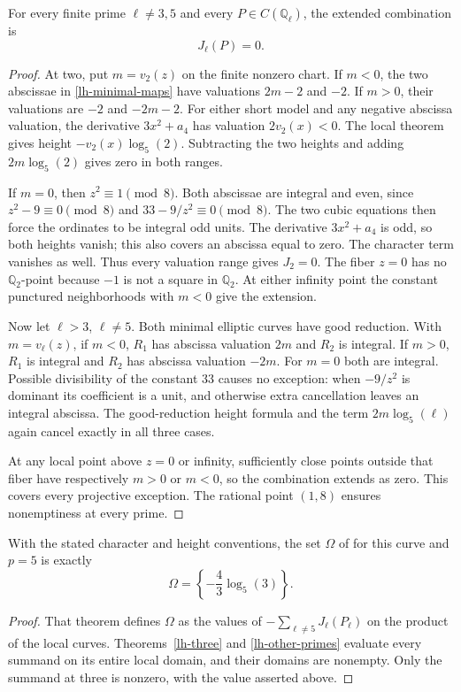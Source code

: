 \begin{theorem}
\label{lh-other-primes}
For every finite prime \(\ell\ne3,5\) and every
\(P\in C(\mathbb Q_\ell)\), the extended combination is
\[
 J_\ell(P)=0.
\]
\end{theorem}
\begin{proof}
At two, put \(m=v_2(z)\) on the finite nonzero chart.
If \(m<0\), the two abscissae in \eqref{lh-minimal-maps} have
valuations \(2m-2\) and \(-2\). If \(m>0\), their valuations are
\(-2\) and \(-2m-2\). For either short model and any negative
abscissa valuation, the derivative \(3x^2+a_4\) has valuation
\(2v_2(x)<0\). The local theorem gives height
\(-v_2(x)\log_5(2)\). Subtracting the two heights and adding
\(2m\log_5(2)\) gives zero in both ranges.

If \(m=0\), then \(z^2\equiv1\pmod8\). Both abscissae are integral
and even, since \(z^2-9\equiv0\pmod8\) and
\(33-9/z^2\equiv0\pmod8\). The two cubic equations then force the
ordinates to be integral odd units. The derivative \(3x^2+a_4\)
is odd, so both heights vanish; this also covers an abscissa equal
to zero. The character term vanishes as well. Thus every valuation
range gives \(J_2=0\).
The fiber \(z=0\) has no \(\mathbb Q_2\)-point because \(-1\) is
not a square in \(\mathbb Q_2\). At either infinity point the
constant punctured neighborhoods with \(m<0\) give the extension.

Now let \(\ell>3\), \(\ell\ne5\). Both minimal elliptic curves have
good reduction. With \(m=v_\ell(z)\), if \(m<0\), \(R_1\) has
abscissa valuation \(2m\) and \(R_2\) is integral. If \(m>0\),
\(R_1\) is integral and \(R_2\) has abscissa valuation \(-2m\).
For \(m=0\) both are integral. Possible divisibility of the constant
33 causes no exception: when \(-9/z^2\) is dominant its coefficient
is a unit, and otherwise extra cancellation leaves an integral
abscissa. The good-reduction height formula and the term
\(2m\log_5(\ell)\) again cancel exactly in all three cases.

At any local point above \(z=0\) or infinity, sufficiently close points
outside that fiber have respectively \(m>0\) or \(m<0\), so the
combination extends as zero. This covers every projective exception.
The rational point \((1,8)\) ensures nonemptiness at every prime.
\end{proof}

\begin{corollary}
\label{lh-omega}
With the stated character and height conventions, the set \(\Omega\)
of \cite[Theorem~1.4]{BalakrishnanDograQCI} for this curve and \(p=5\)
is exactly
\[
 \Omega=\left\{-\frac43\log_5(3)\right\}.
\]
\end{corollary}
\begin{proof}
That theorem defines \(\Omega\) as the values of
\(-\sum_{\ell\ne5}J_\ell(P_\ell)\) on the product of the local curves.
Theorems~\ref{lh-three} and \ref{lh-other-primes} evaluate every
summand on its entire local domain, and their domains are nonempty.
Only the summand at three is nonzero, with the value asserted above.
\end{proof}

